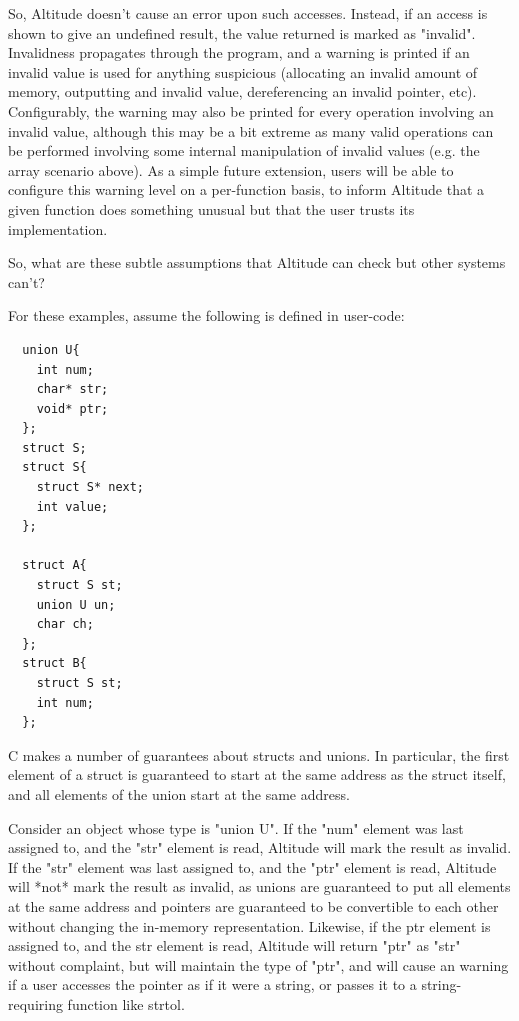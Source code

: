 \documentclass[10pt,a4paper]{report}
\begin{document}
So, Altitude doesn't cause an error upon such accesses. Instead, if an access is shown to give an undefined result, the value returned is marked as "invalid". Invalidness propagates through the program, and a warning is printed if an invalid value is used for anything suspicious (allocating an invalid amount of memory, outputting and invalid value, dereferencing an invalid pointer, etc). Configurably, the warning may also be printed for every operation involving an invalid value, although this may be a bit extreme as many valid operations can be performed involving some internal manipulation of invalid values (e.g. the array scenario above). As a simple future extension, users will be able to configure this warning level on a per-function basis, to inform Altitude that a given function does something unusual but that the user trusts its implementation.

So, what are these subtle assumptions that Altitude can check but other systems can't?

For these examples, assume the following is defined in user-code:

\begin{verbatim}
  union U{
    int num;
    char* str;
    void* ptr;
  };
  struct S;
  struct S{
    struct S* next;
    int value;
  };

  struct A{
    struct S st;
    union U un;
    char ch;
  };
  struct B{
    struct S st;
    int num;
  };

\end{verbatim}

C makes a number of guarantees about structs and unions. In particular, the first element of a struct is guaranteed to start at the same address as the struct itself, and all elements of the union start at the same address.

Consider an object whose type is "union U". If the "num" element was last assigned to, and the "str" element is read, Altitude will mark the result as invalid. If the "str" element was last assigned to, and the "ptr" element is read, Altitude will *not* mark the result as invalid, as unions are guaranteed to put all elements at the same address and pointers are guaranteed to be convertible to each other without changing the in-memory representation. Likewise, if the ptr element is assigned to, and the str element is read, Altitude will return "ptr" as "str" without complaint, but will maintain the type of "ptr", and will cause an warning if a user accesses the pointer as if it were a string, or passes it to a string-requiring function like strtol.
\end{document}

